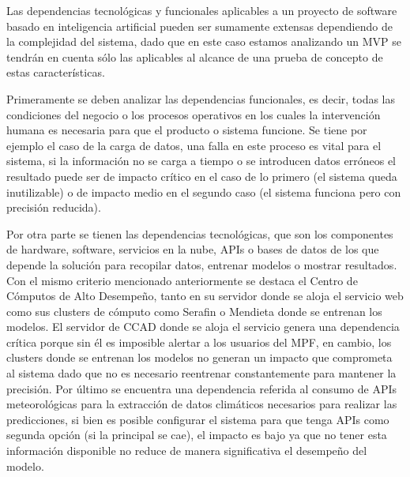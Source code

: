 Las dependencias tecnológicas y funcionales aplicables a un proyecto de software basado en inteligencia artificial pueden ser sumamente extensas dependiendo de la complejidad del sistema, dado que en este caso estamos analizando un MVP se tendrán en cuenta sólo las aplicables al alcance de una prueba de concepto de estas características.

Primeramente se deben analizar las dependencias funcionales, es decir, todas las condiciones del negocio o los procesos operativos en los cuales la intervención humana es necesaria para que el producto o sistema funcione. Se tiene por ejemplo el caso de la carga de datos, una falla en este proceso es vital para el sistema, si la información no se carga a tiempo o se introducen datos erróneos el resultado puede ser de impacto crítico en el caso de lo primero (el sistema queda inutilizable) o de impacto medio en el segundo caso (el sistema funciona pero con precisión reducida).

Por otra parte se tienen las dependencias tecnológicas, que son los componentes de hardware, software, servicios en la nube, APIs o bases de datos de los que depende la solución para recopilar datos, entrenar modelos o mostrar resultados. Con el mismo criterio mencionado anteriormente se destaca el Centro de Cómputos de Alto Desempeño, tanto en su servidor donde se aloja el servicio web como sus clusters de cómputo como Serafin o Mendieta donde se entrenan los modelos. El servidor de CCAD donde se aloja el servicio genera una dependencia crítica porque sin él es imposible alertar a los usuarios del MPF, en cambio, los clusters donde se entrenan los modelos no generan un impacto que comprometa al sistema dado que no es necesario reentrenar constantemente para mantener la precisión. Por último se encuentra una dependencia referida al consumo de APIs meteorológicas para la extracción de datos climáticos necesarios para realizar las predicciones, si bien es posible configurar el sistema para que tenga APIs como segunda opción (si la principal se cae), el impacto es bajo ya que no tener esta información disponible no reduce de manera significativa el desempeño del modelo.

